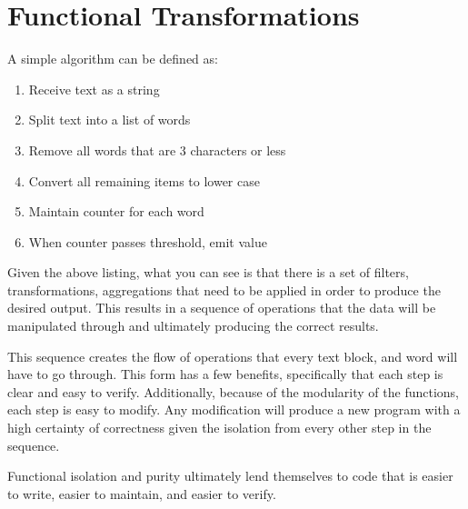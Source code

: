 \chapter{Functional Transformations}

A simple algorithm can be defined as:

\begin{enumerate}
  \item Receive text as a string
  \item Split text into a list of words
  \item Remove all words that are 3 characters or less
  \item Convert all remaining items to lower case
  \item Maintain counter for each word 
  \item When counter passes threshold, emit value
\end{enumerate}

Given the above listing, what you can see is that there is a set of filters, transformations, aggregations that need to be applied in order to produce the desired output.  This results in a sequence of operations that the data will be manipulated through and ultimately producing the correct results.

This sequence creates the flow of operations that every text block, and word will have to go through.  This form has a few benefits, specifically that each step is clear and easy to verify.  Additionally, because of the modularity of the functions, each step is easy to modify.  Any modification will produce a new program with a high certainty of correctness given the isolation from every other step in the sequence.  

Functional isolation and purity ultimately lend themselves to code that is easier to write, easier to maintain, and easier to verify.


